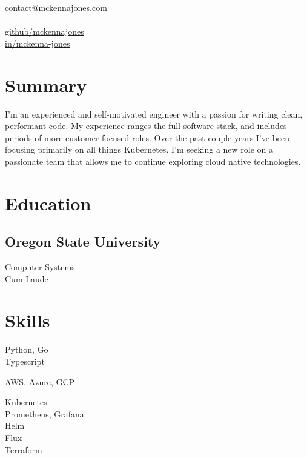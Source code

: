 \documentclass[]{hieudo-build}
\begin{document}
%
%
{
	\faEnvelope \href{mailto:contact@mckennajones.com}{ contact@mckennajones.com}\\
	 \\
	\faGithub \href{https://github.com/mckennajones}{   github/mckennajones}\\
	\faLinkedin \href{https://www.linkedin.com/in/mckenna-jones}{   in/mckenna-jones}}
    
%
%
\begin{minipage}[t]{0.25\textwidth} 

\section{Summary} 
I'm an experienced and self-motivated engineer with a passion for writing clean, performant code. My experience ranges the full software stack, and includes periods of more customer focused roles. Over the past couple years I've been focusing primarily on all things Kubernetes. I'm seeking a new role on a passionate team that allows me to continue exploring cloud native technologies.

\vspace{15pt}
\section{Education} 

\subsection{Oregon State University}
Computer Systems \\
Cum Laude\\

\vspace{15pt}
\section{Skills}
Python, Go\\
Typescript
\sectionsep

AWS, Azure, GCP
\sectionsep

Kubernetes\\
Prometheus, Grafana\\
Helm\\
Flux\\
Terraform 
\sectionsep

%
%
\end{minipage} 
\end{document}
